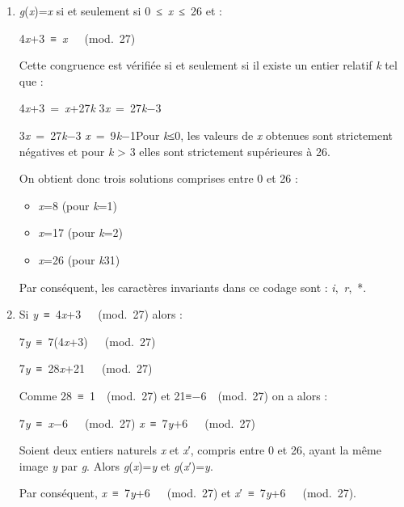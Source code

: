 \begin{corrige}
     \begin{enumerate}
          \item
          \textit{g}(\textit{x})=\textit{x} si et seulement si 0 ≤ \textit{x} ≤ 26 et :
          \par
          4\textit{x}+3 ≡ \textit{x}   (mod. 27)
          \par
          Cette congruence est vérifiée si et seulement si il existe un entier relatif \textit{k} tel que :
          \par
          4\textit{x}+3 = \textit{x}+27\textit{k}
          3\textit{x} = 27\textit{k}−3
          \par
          3\textit{x} = 27\textit{k}−3
          \textit{x} = 9\textit{k}−1Pour \textit{k}≤0, les valeurs de \textit{x} obtenues sont strictement négatives et pour \textit{k} > 3 elles sont strictement supérieures à 26.
          \par
          On obtient donc trois solutions comprises entre 0 et 26 :
          \begin{itemize}
               \item
               \textit{x}=8 (pour \textit{k}=1)
               \item
               \textit{x}=17 (pour \textit{k}=2)
               \item
               \textit{x}=26 (pour \textit{k}31)
          \end{itemize}
          Par conséquent, les caractères invariants dans ce codage sont : \textit{i}, \textit{r}, *.
          \item
          Si \textit{y} ≡ 4\textit{x}+3   (mod. 27) alors :
          \par
          7\textit{y} ≡ 7(4\textit{x}+3)   (mod. 27)
          \par
          7\textit{y} ≡ 28\textit{x}+21   (mod. 27)
\par
Comme 28 ≡ 1  (mod. 27) et 21≡−6  (mod. 27) on a alors :
          \par
          7\textit{y} ≡ \textit{x}−6   (mod. 27)
          \textit{x} ≡ 7\textit{y}+6   (mod. 27)
          \par
          Soient deux entiers naturels \textit{x} et \textit{x}′, compris entre 0 et 26, ayant la même image \textit{y} par \textit{g}. Alors \textit{g}(\textit{x})=\textit{y} et \textit{g}(\textit{x}′)=\textit{y}.
          \par
          Par conséquent, \textit{x} ≡ 7\textit{y}+6   (mod. 27) et \textit{x}′ ≡ 7\textit{y}+6   (mod. 27).

\end{enumerate}
\end{corrige}
